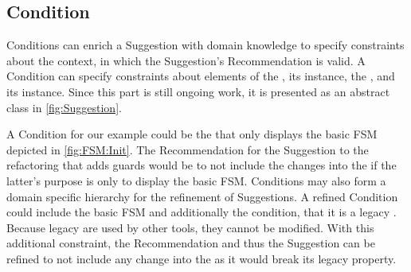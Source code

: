 \subsection{Condition}
\label{sec:Conditions}
\textsf{Condition}s can enrich a \textsf{Suggestion} with domain knowledge to 
specify constraints about the context, in which the \textsf{Suggestion}'s 
\textsf{Recommendation} is valid. A \textsf{Condition} can specify constraints 
about elements of the \metamodel, its instance, the \viewtype \metamodel, and 
its instance. 
Since this part is still ongoing work, it is presented as an abstract class 
in \cref{fig:Suggestion}.

A \textsf{Condition} for our example could be the \viewtype that 
only displays the basic \textsf{FSM} depicted in \cref{fig:FSM:Init}. 
The \textsf{Recommendation} for the \textsf{Suggestion} to the refactoring that 
adds guards would be to not include the \metamodel changes into the \viewtype if the latter's purpose is only to display the basic \textsf{FSM}.
\textsf{Conditions} may also form a 
domain specific hierarchy for the refinement of \textsf{Suggestion}s. A refined 
\textsf{Condition} could include the basic \textsf{FSM} \viewtype and additionally
the condition, that it is a legacy \viewtype. Because legacy \viewtypes are used
by other tools, they cannot be modified. With this additional constraint, the 
\textsf{Recommendation} and thus the \textsf{Suggestion} can be refined to not 
include any \metamodel change into the \viewtype as it would break its legacy 
property.